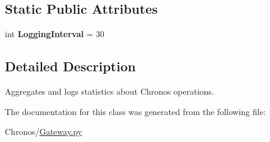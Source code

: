 \subsection*{Static Public Attributes}
\begin{DoxyCompactItemize}
\item 
int {\bfseries Logging\+Interval} = 30
\end{DoxyCompactItemize}


\subsection{Detailed Description}
Aggregates and logs statistics about Chronos operations. 



The documentation for this class was generated from the following file\+:\begin{DoxyCompactItemize}
\item 
Chronos/\hyperlink{Gateway_8py}{Gateway.\+py}\end{DoxyCompactItemize}
